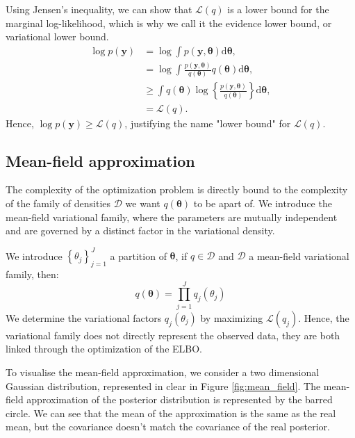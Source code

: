 \documentclass{article}
\numberwithin{equation}{section}
\begin{document}
Using Jensen's inequality, we can show that $\mathcal{L}(q)$ is a lower bound for the marginal log-likelihood, which is why we call it the evidence lower bound, or variational lower bound.
\begin{align*}
\log p(\boldsymbol{y}) &= \log \int p(\boldsymbol{y}, \boldsymbol{\theta}) \mathrm{d}\boldsymbol{\theta},\\
&= \log \int \frac{p(\boldsymbol{y}, \boldsymbol{\theta})}{q(\boldsymbol{\theta})}q(\boldsymbol{\theta})\mathrm{d}\boldsymbol{\theta}
,\\
&\geq \int q(\boldsymbol{\theta}) \log \left\lbrace \frac{p(\boldsymbol{y}, \boldsymbol{\theta})}{q(\boldsymbol{\theta})} \right\rbrace \mathrm{d}\boldsymbol{\theta},\\
&= \mathcal{L}(q).
\end{align*}
Hence, $\log p(\boldsymbol{y}) \geq \mathcal{L}(q)$, justifying the name "lower bound" for $\mathcal{L}(q)$.

\subsection{Mean-field approximation}
The complexity of the optimization problem is directly bound to the complexity of the family of densities $\mathcal{D}$ we want $q(\boldsymbol{\theta})$ to be apart of. We introduce the mean-field variational family, where the parameters are mutually independent and are governed by a distinct factor in the variational density.

We introduce $\left\lbrace \theta_j\right\rbrace_{j=1}^J$ a partition of $\boldsymbol{\theta}$, if $q \in \mathcal{D}$ and $\mathcal{D}$ a mean-field variational family, then:
\begin{equation*}
q(\boldsymbol{\theta}) = \prod_{j=1}^J q_j(\theta_j)
\end{equation*}
We determine the variational factors $q_j(\theta_j)$ by maximizing $\mathcal{L}(q_j)$. Hence, the variational family does not directly represent the observed data, they are both linked through the optimization of the \small{ELBO}.

To visualise the mean-field approximation, we consider a two dimensional Gaussian distribution, represented in clear in Figure \ref{fig:mean_field}. The mean-field approximation of the posterior distribution is represented by the barred circle. We can see that the mean of the approximation is the same as the real mean, but the covariance doesn't match the covariance of the real posterior.
\end{document}
